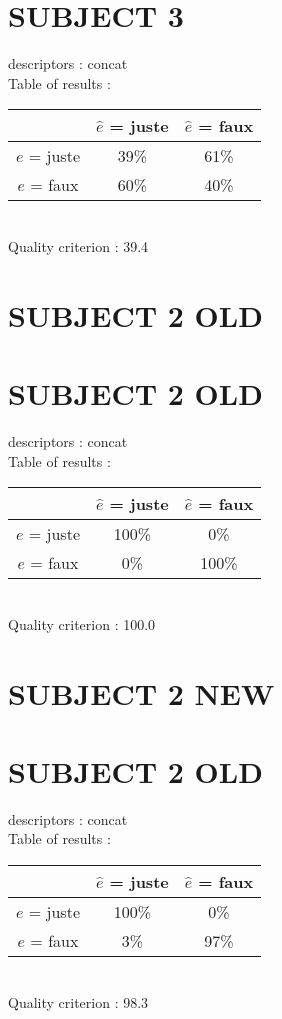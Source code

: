 \section*{SUBJECT 3}
descriptors : concat \\
Table of results : \\
\begin{tabular}{|c|c|c|}
\hline				& $\hat{e}$ = juste & $\hat{e}$ = faux \\
\hline  $e$ = juste	&     39\%			&     61\%		\\
\hline  $e$ = faux	&     60\%			&     40\%		\\
\hline
\end{tabular}\\
Quality criterion :   39.4 \\

\newpage
\section*{SUBJECT 2 OLD}
\newpage
\section*{SUBJECT 2 OLD}
descriptors : concat \\
Table of results : \\
\begin{tabular}{|c|c|c|}
\hline				& $\hat{e}$ = juste & $\hat{e}$ = faux \\
\hline  $e$ = juste	&    100\%			&      0\%		\\
\hline  $e$ = faux	&      0\%			&    100\%		\\
\hline
\end{tabular}\\
Quality criterion :  100.0 \\

\newpage
\section*{SUBJECT 2 NEW}
\newpage
\section*{SUBJECT 2 OLD}
descriptors : concat \\
Table of results : \\
\begin{tabular}{|c|c|c|}
\hline				& $\hat{e}$ = juste & $\hat{e}$ = faux \\
\hline  $e$ = juste	&    100\%			&      0\%		\\
\hline  $e$ = faux	&      3\%			&     97\%		\\
\hline
\end{tabular}\\
Quality criterion :   98.3 \\

